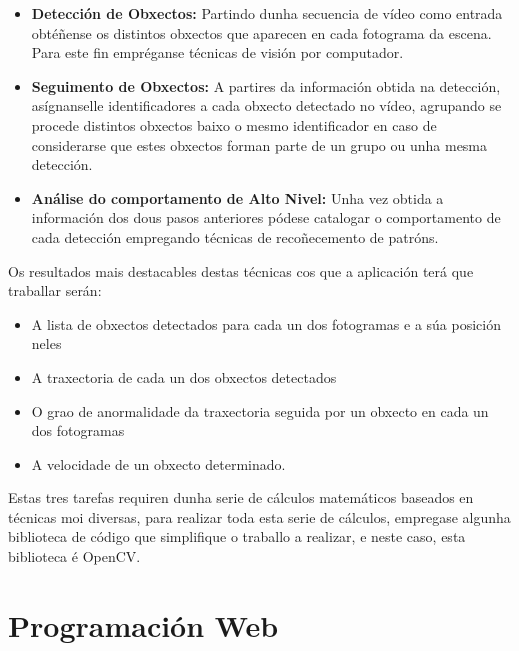 	\begin{itemize}
	
		\item{\textbf{Detección de Obxectos:}}\label{cap:DeteccionObxetos} Partindo dunha secuencia de vídeo como 
		entrada obtéñense os distintos obxectos que aparecen en cada fotograma da escena.
		Para este fin empréganse técnicas de visión por computador.
		
		
		\item{\textbf{Seguimento de Obxectos:}} A partires da información obtida na detección, asígnanselle 
		identificadores a cada obxecto detectado no vídeo, agrupando se procede distintos
		obxectos baixo o mesmo identificador en caso de considerarse que estes obxectos forman
		parte de un grupo ou unha mesma detección.
		
		
		\item{\textbf{Análise do comportamento de Alto Nivel:}} Unha vez obtida a información dos 
		dous pasos anteriores pódese catalogar o comportamento de cada detección empregando
		técnicas de recoñecemento de patróns.
	
	\end{itemize}	
	
	Os resultados mais destacables destas técnicas cos que a aplicación terá que traballar serán:
	\begin{itemize}
		\item A lista de obxectos detectados para cada un dos fotogramas e a súa posición neles
		\item A traxectoria de cada un dos obxectos detectados
		\item O grao de anormalidade da traxectoria seguida por un obxecto en cada un dos fotogramas
		\item A velocidade de un obxecto determinado.
	\end{itemize}
	
	Estas tres tarefas requiren dunha serie de cálculos matemáticos baseados en técnicas moi diversas,
	para realizar toda esta serie de cálculos, empregase algunha biblioteca de código que simplifique 
	o traballo a realizar, e neste caso, esta biblioteca é OpenCV.
	
\section{Programación Web}

